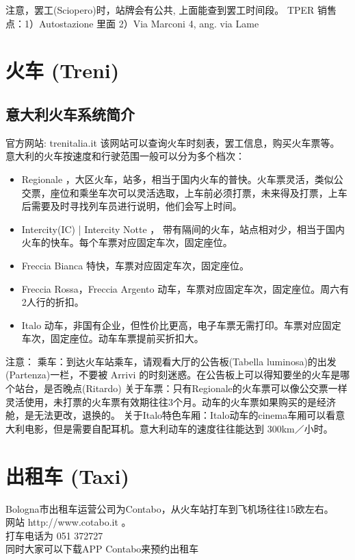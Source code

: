 注意，罢工(Sciopero)时，站牌会有公共, 上面能查到罢工时间段。
TPER 销售点：1）Autostazione 里面 2）Via Marconi 4, ang. via Lame



\section{火车 (Treni)}

\subsection{意大利火车系统简介}

官方网站: trenitalia.it 该网站可以查询火车时刻表，罢工信息，购买火车票等。
意大利的火车按速度和行驶范围一般可以分为多个档次：
\begin{itemize}
\item  Regionale ，大区火车，站多，相当于国内火车的普快。火车票灵活，类似公交票，座位和乘坐车次可以灵活选取，上车前必须打票，未来得及打票，上车后需要及时寻找列车员进行说明，他们会写上时间。
\item  Intercity(IC) | Intercity Notte ， 带有隔间的火车，站点相对少，相当于国内火车的快车。每个车票对应固定车次，固定座位。
\item  Freccia Bianca 特快，车票对应固定车次，固定座位。
\item  Freccia Rossa，Freccia Argento 动车，车票对应固定车次，固定座位。周六有2人行的折扣。
\item  Italo 动车，非国有企业，但性价比更高，电子车票无需打印。车票对应固定车次，固定座位。动车车票提前买折扣大。
\end{itemize}
注意：
乘车：到达火车站乘车，请观看大厅的公告板(Tabella luminosa)的出发(Partenza)一栏，不要被 Arrivi 的时刻迷惑。在公告板上可以得知要坐的火车是哪个站台，是否晚点(Ritardo)
关于车票：只有Regionale的火车票可以像公交票一样灵活使用，未打票的火车票有效期往往3个月。动车的火车票如果购买的是经济舱，是无法更改，退换的。
关于Italo特色车厢：Italo动车的cinema车厢可以看意大利电影，但是需要自配耳机。意大利动车的速度往往能达到 300km／小时。


\section{出租车 (Taxi)}
Bologna市出租车运营公司为Contabo，从火车站打车到飞机场往往15欧左右。\\
网站 http://www.cotabo.it 。\\
打车电话为 051 372727 \\
同时大家可以下载APP Contabo来预约出租车

